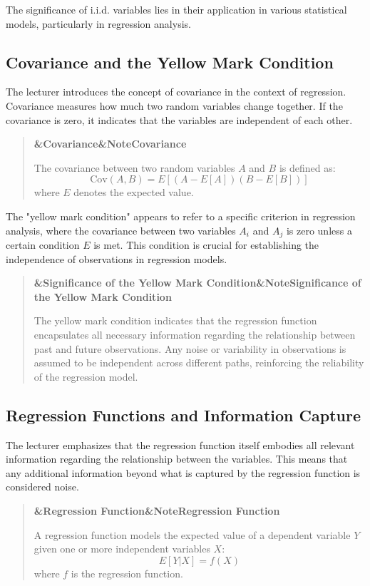\documentclass[a4paper]{article}
\newcommand{\boxheading}[1]{%
  \par\smallskip
  \noindent\textbf{\ifx&#1&Note\else#1\fi}\par
  \smallskip
}
\newenvironment{thmbox}[1][]{%
  \begin{quote}\color{blue!60!black}\boxheading{#1}\normalcolor
}{\end{quote}}
\newenvironment{defbox}[1][]{%
  \begin{quote}\color{green!40!black}\boxheading{#1}\normalcolor
}{\end{quote}}
\newenvironment{rembox}[1][]{%
  \begin{quote}\color{black!70}\boxheading{#1}\normalcolor
}{\end{quote}}
\begin{document}
The significance of i.i.d. variables lies in their application in various statistical models, particularly in regression analysis.

\subsection{Covariance and the Yellow Mark Condition}
The lecturer introduces the concept of covariance in the context of regression. Covariance measures how much two random variables change together. If the covariance is zero, it indicates that the variables are independent of each other.

\begin{thmbox}[Covariance]
The covariance between two random variables \( A \) and \( B \) is defined as:
\[
\text{Cov}(A, B) = E[(A - E[A])(B - E[B])]
\]
where \( E \) denotes the expected value.
\end{thmbox}

The "yellow mark condition" appears to refer to a specific criterion in regression analysis, where the covariance between two variables \( A_i \) and \( A_j \) is zero unless a certain condition \( E \) is met. This condition is crucial for establishing the independence of observations in regression models.

\begin{rembox}[Significance of the Yellow Mark Condition]
The yellow mark condition indicates that the regression function encapsulates all necessary information regarding the relationship between past and future observations. Any noise or variability in observations is assumed to be independent across different paths, reinforcing the reliability of the regression model.
\end{rembox}

\subsection{Regression Functions and Information Capture}
The lecturer emphasizes that the regression function itself embodies all relevant information regarding the relationship between the variables. This means that any additional information beyond what is captured by the regression function is considered noise.

\begin{defbox}[Regression Function]
A regression function models the expected value of a dependent variable \( Y \) given one or more independent variables \( X \):
\[
E[Y | X] = f(X)
\]
where \( f \) is the regression function.
\end{defbox}
\end{document}
